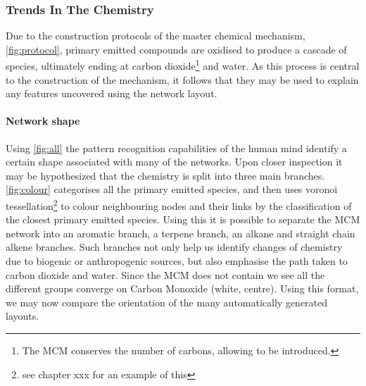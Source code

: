 \subsubsection{Trends In The Chemistry}
Due to the construction protocols of the master chemical mechanism, \autoref{fig:protocol}, primary emitted compounds are oxidised to produce a cascade of species, ultimately ending at carbon dioxide\footnote{The MCM conserves the number of carbons, allowing  to be introduced.} and water. As this process is central to the construction of the mechanism, it follows that they may be used to explain any features uncovered using the network layout. 

\paragraph{Network shape}\label{sec:netshape}
Using \autoref{fig:all} the pattern recognition capabilities of the human mind identify a certain shape associated with many of the networks. Upon closer inspection it may be hypothesized that the chemistry is split into three main branches. \autoref{fig:colour} categorises all the primary emitted species, and then uses voronoi tessellation\footnote{see chapter xxx for an example of this} to colour neighbouring nodes and their links by the classification of the closest primary emitted species. Using this it is possible to separate the MCM network into an aromatic branch, a terpene branch, an alkane and straight chain alkene branches. Such branches not only help us identify changes of chemistry due to biogenic or anthropogenic sources, but also emphasise the path taken to carbon dioxide and water. Since the MCM does not contain  we see all the different groups converge on Carbon Monoxide (white, centre). Using this format, we may now compare the orientation of the many automatically generated layouts.  
 
